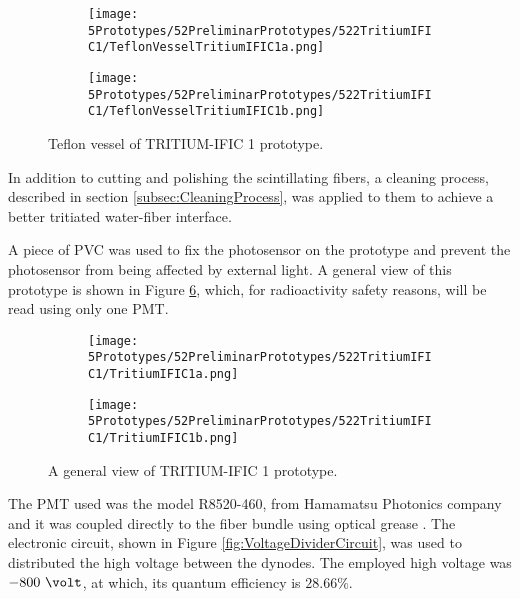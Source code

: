 \begin{figure}
\centering
    \begin{subfigure}[b]{0.30\textwidth}
    \centering
    \texttt{[image: 5Prototypes/52PreliminarPrototypes/522TritiumIFIC1/TeflonVesselTritiumIFIC1a.png]}  
    \caption{\label{subfig:TeflonVesselTritumIFIC1a}}
    \end{subfigure}
    \hfill
    \begin{subfigure}[b]{0.45\textwidth}
    \centering
    \texttt{[image: 5Prototypes/52PreliminarPrototypes/522TritiumIFIC1/TeflonVesselTritiumIFIC1b.png]}  
    \caption{\label{subfig:TeflonVesselTritumIFIC1b}}
    \end{subfigure}
 \caption{Teflon vessel of TRITIUM-IFIC 1 prototype.}
 \label{fig:TeflonVesselTritumIFIC1}
\end{figure}

In addition to cutting and polishing the scintillating fibers, a cleaning process, described in section \ref{subsec:CleaningProcess}, was applied to them to achieve a better tritiated water-fiber interface.

A piece of PVC was used to fix the photosensor on the prototype and prevent the photosensor from being affected by external light. A general view of this prototype is shown in Figure \ref{fig:TritumIFIC1}, which, for radioactivity safety reasons, will be read using only one PMT.

\begin{figure}
\centering
    \begin{subfigure}[b]{0.40\textwidth}
    \centering
    \texttt{[image: 5Prototypes/52PreliminarPrototypes/522TritiumIFIC1/TritiumIFIC1a.png]}  
    \caption{\label{subfig:TritumIFIC1a}}
    \end{subfigure}
    \hfill
    \begin{subfigure}[b]{0.40\textwidth}
    \centering
    \texttt{[image: 5Prototypes/52PreliminarPrototypes/522TritiumIFIC1/TritiumIFIC1b.png]}  
    \caption{\label{subfig:TritumIFIC1b}}
    \end{subfigure}
 \caption{A general view of TRITIUM-IFIC 1 prototype.}
 \label{fig:TritumIFIC1}
\end{figure}

The PMT used was the model R8520-460, from Hamamatsu Photonics company \cite{DataSheetPMTs} and it was coupled directly to the fiber bundle using optical grease \cite{OpticalGrease}. The electronic circuit, shown in Figure \ref{fig:VoltageDividerCircuit}, was used to distributed the high voltage between the dynodes. The employed high voltage was $-800~\volt$, at which, its quantum efficiency is $28.66\%$.

